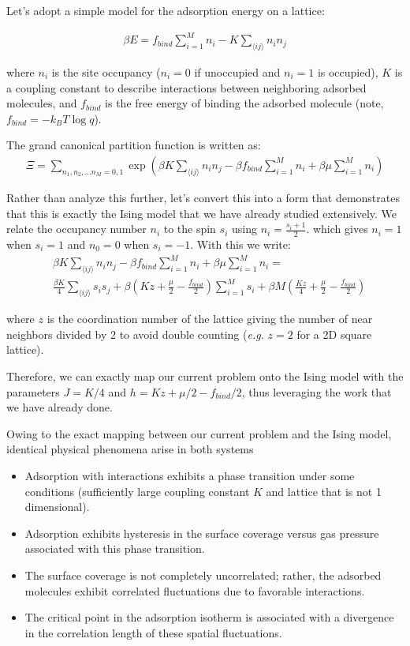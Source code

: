 \documentclass[book.tex]{subfiles}
\begin{document}
Let's adopt a simple model for the adsorption energy on a lattice:

\begin{align}\label{Eq11}
\beta E = f_{bind}\sum_{i=1}^M n_i - K \sum_{\langle i j \rangle} n_in_j
\end{align}

\noindent where $n_i$ is the site occupancy ($n_i = 0$ if unoccupied and $n_i = 1$ is occupied), $K$ is a coupling constant to describe interactions between neighboring adsorbed molecules, and $f_{bind}$ is the free energy of binding the adsorbed molecule (note, $f_{bind} = -k_BT \log q$).

The grand canonical partition function is written as:
\begin{align}
\Xi = \sum_{n_1,n_2,...n_M = 0,1} \exp \left( \beta K \sum_{\langle i j \rangle} n_in_j - \beta f_{bind}\sum_{i=1}^M n_i + \beta \mu\sum_{i=1}^M n_i \right)
\end{align}

Rather than analyze this further, let's convert this into a form that demonstrates that this is exactly the Ising model that we have already studied extensively. We relate the occupancy number $n_i$ to the spin $s_i$ using $n_i = \frac{s_i+1}{2}$. which gives $n_i=1$ when $s_i=1$ and $n_0=0$ when $s_i=-1$. With this we write:
\begin{align}
&\beta K \sum_{\langle i j \rangle} n_in_j - \beta f_{bind}\sum_{i=1}^M n_i + \beta \mu\sum_{i=1}^M n_i = \\
&\frac{\beta K}{4} \sum_{\langle i j \rangle} s_is_j + \beta \left(Kz + \frac{\mu}{2} - \frac{f_{bind}}{2}\right)\sum_{i=1}^M s_i + \beta M \left(\frac{Kz}{4}+\frac{\mu}{2} - \frac{f_{bind}}{2}\right) 
\end{align}

\noindent where $z$ is the coordination number of the lattice giving the number of near neighbors divided by 2 to avoid double counting (\textit{e.g.} $z = 2$ for a 2D square lattice).

Therefore, we can exactly map our current problem onto the Ising model with the parameters $J = K/4$ and $h = Kz+\mu/2- f_{bind}/2$, thus leveraging the work that we have already done.

Owing to the exact mapping between our current problem and the Ising model, identical physical phenomena arise in both systems
\begin{itemize}
\item Adsorption with interactions exhibits a phase transition under some conditions (sufficiently large coupling constant $K$ and lattice that is not 1 dimensional).
\item Adsorption exhibits hysteresis in the surface coverage versus gas pressure associated with this phase transition.
\item The surface coverage is not completely uncorrelated; rather, the adsorbed molecules exhibit correlated fluctuations due to favorable interactions.
\item The critical point in the adsorption isotherm is associated with a divergence in the correlation length of these spatial fluctuations.
\end{itemize}
\end{document}

